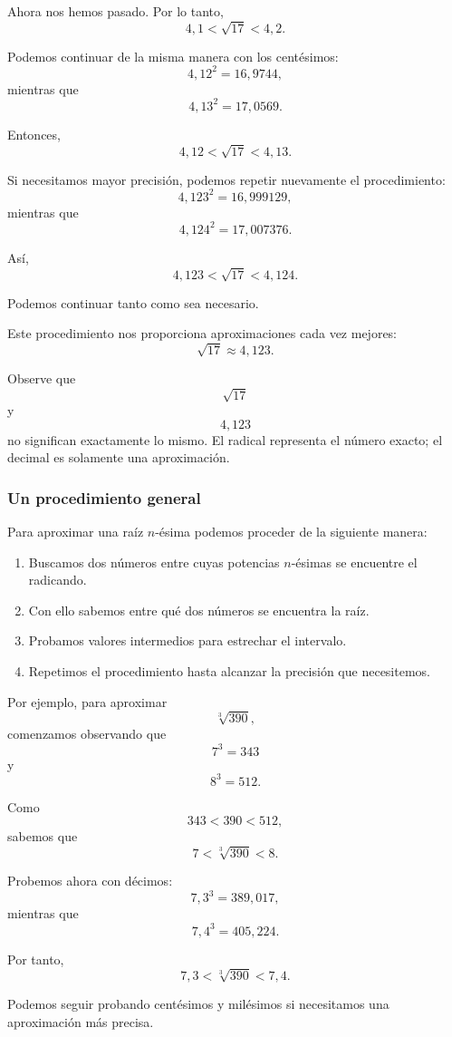 Ahora nos hemos pasado. Por lo tanto,
\[
4{,}1<\sqrt{17}<4{,}2.
\]

Podemos continuar de la misma manera con los centésimos:
\[
4{,}12^2=16{,}9744,
\]
mientras que
\[
4{,}13^2=17{,}0569.
\]

Entonces,
\[
4{,}12<\sqrt{17}<4{,}13.
\]

Si necesitamos mayor precisión, podemos repetir nuevamente el procedimiento:
\[
4{,}123^2=16{,}999129,
\]
mientras que
\[
4{,}124^2=17{,}007376.
\]

Así,
\[
4{,}123<\sqrt{17}<4{,}124.
\]

Podemos continuar tanto como sea necesario.

Este procedimiento nos proporciona aproximaciones cada vez mejores:
\[
\sqrt{17}\approx4{,}123.
\]

Observe que
\[
\sqrt{17}
\]
y
\[
4{,}123
\]
no significan exactamente lo mismo. El radical representa el número exacto; el decimal es solamente una aproximación.

\subsubsection{Un procedimiento general}

Para aproximar una raíz \(n\)-ésima podemos proceder de la siguiente manera:

\begin{enumerate}
    \item Buscamos dos números entre cuyas potencias \(n\)-ésimas se encuentre el radicando.
    \item Con ello sabemos entre qué dos números se encuentra la raíz.
    \item Probamos valores intermedios para estrechar el intervalo.
    \item Repetimos el procedimiento hasta alcanzar la precisión que necesitemos.
\end{enumerate}

Por ejemplo, para aproximar
\[
\sqrt[3]{390},
\]
comenzamos observando que
\[
7^3=343
\]
y
\[
8^3=512.
\]

Como
\[
343<390<512,
\]
sabemos que
\[
7<\sqrt[3]{390}<8.
\]

Probemos ahora con décimos:
\[
7{,}3^3=389{,}017,
\]
mientras que
\[
7{,}4^3=405{,}224.
\]

Por tanto,
\[
7{,}3<\sqrt[3]{390}<7{,}4.
\]

Podemos seguir probando centésimos y milésimos si necesitamos una aproximación más precisa.

